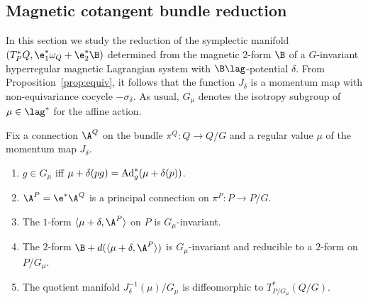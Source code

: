 \subsection{Magnetic cotangent bundle reduction}\label{section5.1}

In this section we study the reduction of the symplectic manifold $(T_P^*Q, \e_1^*\omega_Q +\e^*_2\B)$ determined from the magnetic 2-form $\B$ of a $G$-invariant hyperregular magnetic Lagrangian system with $\B\lag$-potential $\delta$. From Proposition~\ref{prop:equiv}, it follows that the function $J_\delta$ is a momentum map with non-equivariance cocycle $-\sigma_\delta$.  As usual, $G_\mu$ denotes the isotropy subgroup of $\mu\in\lag^*$ for the af\/f\/ine action.


\begin{proposition} Fix a connection $\A^Q$ on the bundle $\pi^Q: Q\to Q/G$ and a regular value $\mu$ of the momentum map $J_\delta$.
\begin{enumerate}\itemsep=0pt
\item[$1.$] $g\in G_\mu$ iff $\mu+\delta(pg)= {\rm Ad}_g^*(\mu+\delta(p))$.
\item[$2.$] $\A^P=\e^*\A^Q$ is a principal connection on $\pi^P:P\to P/G$.
\item[$3.$] The $1$-form $\langle \mu+\delta,\A^P\rangle$ on $P$ is $G_\mu$-invariant.
\item[$4.$]  The $2$-form $\B + d(\langle \mu+\delta,\A^P\rangle)$ is $G_\mu$-invariant and reducible to a $2$-form on $P/G_\mu$.
\item[$5.$] The quotient manifold $J_\delta^{-1}(\mu)/G_\mu$ is diffeomorphic to $T^*_{P/G_\mu}(Q/G)$.
\end{enumerate}
\end{proposition}

